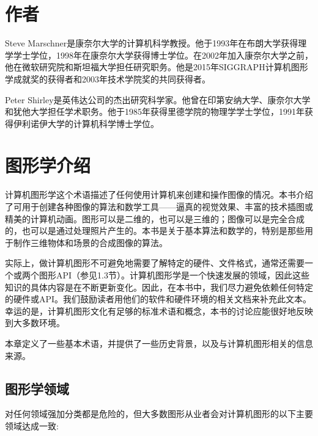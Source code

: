 \documentclass[lang=cn,10pt]{elegantbook}
\begin{document}



\chapter{作者}

Steve Marschner是康奈尔大学的计算机科学教授。他于1993年在布朗大学获得理学学士学位，1998年在康奈尔大学获得博士学位。在2002年加入康奈尔大学之前，他在微软研究院和斯坦福大学担任研究职务。他是2015年SIGGRAPH计算机图形学成就奖的获得者和2003年技术学院奖的共同获得者。

Peter Shirley是英伟达公司的杰出研究科学家。他曾在印第安纳大学、康奈尔大学和犹他大学担任学术职务。他于1985年获得里德学院的物理学学士学位，1991年获得伊利诺伊大学的计算机科学博士学位。

\tableofcontents

\mainmatter

\chapter{图形学介绍}

计算机图形学这个术语描述了任何使用计算机来创建和操作图像的情况。本书介绍了可用于创建各种图像的算法和数学工具——逼真的视觉效果、丰富的技术插图或精美的计算机动画。图形可以是二维的，也可以是三维的；图像可以是完全合成的，也可以是通过处理照片产生的。本书是关于基本算法和数学的，特别是那些用于制作三维物体和场景的合成图像的算法。

实际上，做计算机图形不可避免地需要了解特定的硬件、文件格式，通常还需要一个或两个图形API（参见1.3节）。计算机图形学是一个快速发展的领域，因此这些知识的具体内容是在不断更新变化。因此，在本书中，我们尽力避免依赖任何特定的硬件或API。我们鼓励读者用他们的软件和硬件环境的相关文档来补充此文本。幸运的是，计算机图形文化有足够的标准术语和概念，本书的讨论应能很好地反映到大多数环境。



本章定义了一些基本术语，并提供了一些历史背景，以及与计算机图形相关的信息来源。

\section{图形学领域}

对任何领域强加分类都是危险的，但大多数图形从业者会对计算机图形的以下主要领域达成一致:
\end{document}
